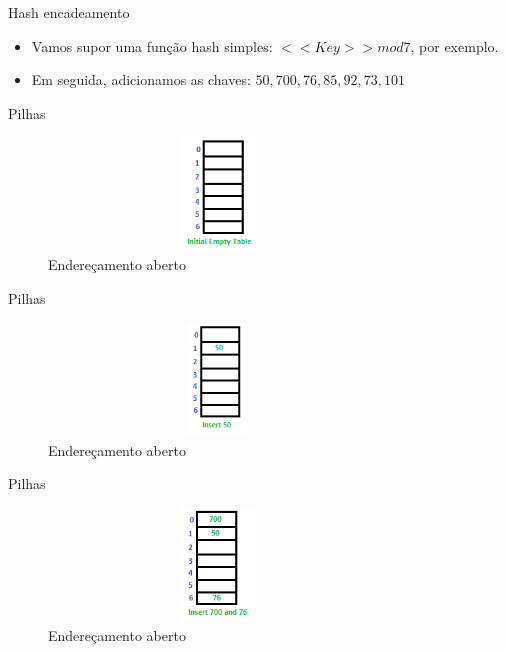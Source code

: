 \begin{frame}
	\begin{block}{Hash encadeamento}
		\begin{itemize}
			\item Vamos supor uma função hash simples: $<<Key>> mod 7$, por exemplo. 
			
			\item Em seguida, adicionamos as chaves: $ 50, 700, 76, 85, 92, 73, 101$

		\end{itemize}
	\end{block}
\end{frame}

\begin{frame}
	\begin{block}{Pilhas}
		\begin{figure}[!htb]
			\centering	  				
			\includegraphics[height=3cm, width = 9cm]{./pic/hashChaining11.png}
			\caption{Endereçamento aberto}
			\label{fig_pilha}
		\end{figure}
	\end{block}
\end{frame}

\begin{frame}
	\begin{block}{Pilhas}
		\begin{figure}[!htb]
			\centering	  				
			\includegraphics[height=3cm, width = 9cm]{./pic/hashChaining12.png}
			\caption{Endereçamento aberto}
			\label{fig_pilha}
		\end{figure}
	\end{block}
\end{frame}

\begin{frame}
	\begin{block}{Pilhas}
		\begin{figure}[!htb]
			\centering	  				
			\includegraphics[height=3cm, width = 9cm]{./pic/hashChaining13.png}
			\caption{Endereçamento aberto}
			\label{fig_pilha}
		\end{figure}
	\end{block}
\end{frame}

